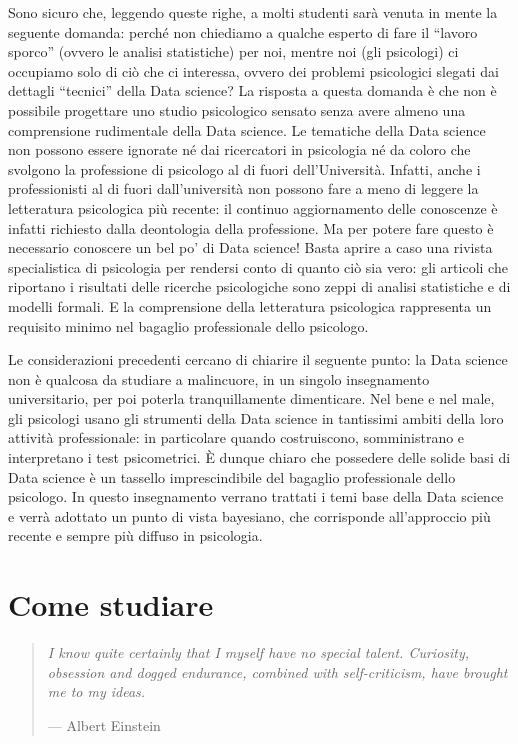 \documentclass[
  10pt,
  italian,
  a4paper,
  extrafontsizes,onecolumn,openright
  ]{memoir}
\theoremstyle{definition}
\theoremstyle{definition}
\theoremstyle{definition}
\theoremstyle{definition}
\theoremstyle{remark}
\begin{document}
Sono sicuro che, leggendo queste righe, a molti studenti sarà venuta in mente la seguente domanda: perché non chiediamo a qualche esperto di fare il ``lavoro sporco'' (ovvero le analisi statistiche) per noi, mentre noi (gli psicologi) ci occupiamo solo di ciò che ci interessa, ovvero dei problemi psicologici slegati dai dettagli ``tecnici'' della Data science? La risposta a questa domanda è che non è possibile progettare uno studio psicologico sensato senza avere almeno una comprensione rudimentale della Data science. Le tematiche della Data science non possono essere ignorate né dai ricercatori in psicologia né da coloro che svolgono la professione di psicologo al di fuori dell'Università. Infatti, anche i professionisti al di fuori dall'università non possono fare a meno di leggere la letteratura psicologica più recente: il continuo aggiornamento delle conoscenze è infatti richiesto dalla deontologia della professione. Ma per potere fare questo è necessario conoscere un bel po' di Data science! Basta aprire a caso una rivista specialistica di psicologia per rendersi conto di quanto ciò sia vero: gli articoli che riportano i risultati delle ricerche psicologiche sono zeppi di analisi statistiche e di modelli formali. E la comprensione della letteratura psicologica rappresenta un requisito minimo nel bagaglio professionale dello psicologo.

Le considerazioni precedenti cercano di chiarire il seguente punto: la Data science non è qualcosa da studiare a malincuore, in un singolo insegnamento universitario, per poi poterla tranquillamente dimenticare. Nel bene e nel male, gli psicologi usano gli strumenti della Data science in tantissimi ambiti della loro attività professionale: in particolare quando costruiscono, somministrano e interpretano i test psicometrici. È dunque chiaro che possedere delle solide basi di Data science è un tassello imprescindibile del bagaglio professionale dello psicologo. In questo insegnamento verrano trattati i temi base della Data science e verrà adottato un punto di vista bayesiano, che corrisponde all'approccio più recente e sempre più diffuso in psicologia.

\hypertarget{come-studiare}{%
\section{Come studiare}\label{come-studiare}}

\begin{quote}
\emph{I know quite certainly that I myself have no special talent. Curiosity, obsession and dogged endurance, combined with self-criticism, have brought me to my ideas.}

\hfill --- Albert Einstein
\end{quote}
\end{document}
